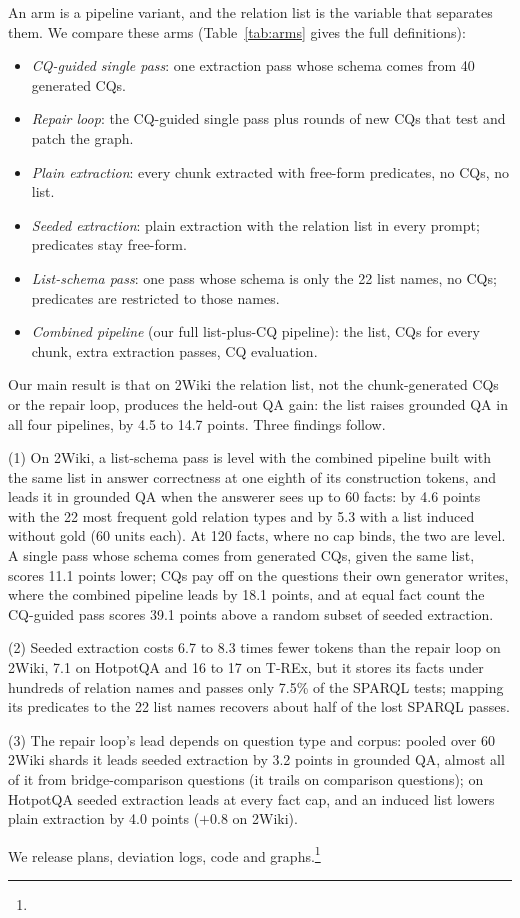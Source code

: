 An arm is a pipeline variant, and the relation list is the variable that separates them. We compare these arms (Table~\ref{tab:arms} gives the full definitions):
\begin{itemize}[nosep]
  \item \emph{CQ-guided single pass}: one extraction pass whose schema comes from 40 generated CQs.
  \item \emph{Repair loop}: the CQ-guided single pass plus rounds of new CQs that test and patch the graph.
  \item \emph{Plain extraction}: every chunk extracted with free-form predicates, no CQs, no list.
  \item \emph{Seeded extraction}: plain extraction with the relation list in every prompt; predicates stay free-form.
  \item \emph{List-schema pass}: one pass whose schema is only the 22 list names, no CQs; predicates are restricted to those names.
  \item \emph{Combined pipeline} (our full list-plus-CQ pipeline): the list, CQs for every chunk, extra extraction passes, CQ evaluation.
\end{itemize}
Our main result is that on 2Wiki the relation list, not the chunk-generated CQs or the repair loop, produces the held-out QA gain: the list raises grounded QA in all four pipelines, by 4.5 to 14.7 points. Three findings follow.

(1) On 2Wiki, a list-schema pass is level with the combined pipeline built with the same list in answer correctness at one eighth of its construction tokens, and leads it in grounded QA when the answerer sees up to 60 facts: by 4.6 points with the 22 most frequent gold relation types and by 5.3 with a list induced without gold (60 units each). At 120 facts, where no cap binds, the two are level. A single pass whose schema comes from generated CQs, given the same list, scores 11.1 points lower; CQs pay off on the questions their own generator writes, where the combined pipeline leads by 18.1 points, and at equal fact count the CQ-guided pass scores 39.1 points above a random subset of seeded extraction.

(2) Seeded extraction costs 6.7 to 8.3 times fewer tokens than the repair loop on 2Wiki, 7.1 on HotpotQA and 16 to 17 on T-REx, but it stores its facts under hundreds of relation names and passes only 7.5\% of the SPARQL tests; mapping its predicates to the 22 list names recovers about half of the lost SPARQL passes.

(3) The repair loop's lead depends on question type and corpus: pooled over 60 2Wiki shards it leads seeded extraction by 3.2 points in grounded QA, almost all of it from bridge-comparison questions (it trails on comparison questions); on HotpotQA seeded extraction leads at every fact cap, and an induced list lowers plain extraction by 4.0 points ($+$0.8 on 2Wiki).

We release plans, deviation logs, code and graphs.\footnote{\releaseurl}
